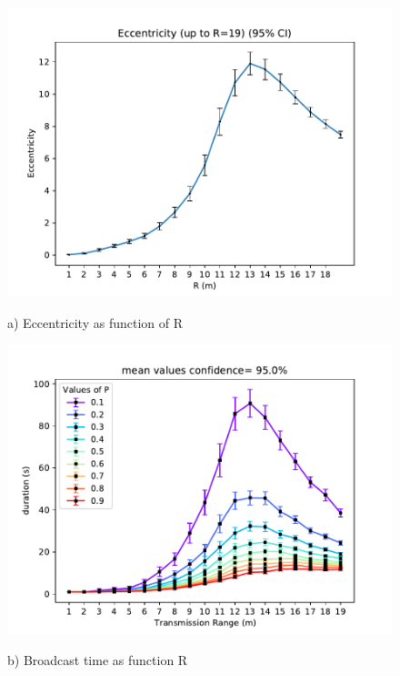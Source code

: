 \begin{figure}[H]
	\begin{minipage}{.5\textwidth}
        \includegraphics[scale=.5]{img/graphAnalysisEccentricityR19.pdf}
        \begin{center}
            a) Eccentricity as function of R
        \end{center}
	\end{minipage}
	\begin{minipage}{.5\textwidth} 
		\includegraphics[scale=.5]{img/big_duration (s)_r_mean_95.0.pdf}
		\begin{center}
            b) Broadcast time as function R
        \end{center}
	\end{minipage}
	\caption{}
    \label{fig:eccentricityDuration}
\end{figure}
